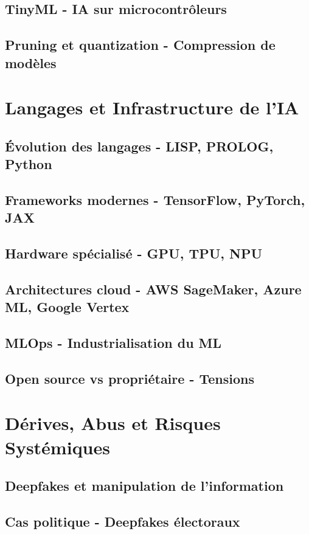 \documentclass[12pt,a4paper]{book}
\begin{document}
\section{TinyML - IA sur microcontrôleurs}
\section{Pruning et quantization - Compression de modèles}

\chapter{Langages et Infrastructure de l'IA}
\section{Évolution des langages - LISP, PROLOG, Python}
\section{Frameworks modernes - TensorFlow, PyTorch, JAX}
\section{Hardware spécialisé - GPU, TPU, NPU}
\section{Architectures cloud - AWS SageMaker, Azure ML, Google Vertex}
\section{MLOps - Industrialisation du ML}
\section{Open source vs propriétaire - Tensions}

\chapter{Dérives, Abus et Risques Systémiques}
\section{Deepfakes et manipulation de l'information}
\section{Cas politique - Deepfakes électoraux}
\end{document}
